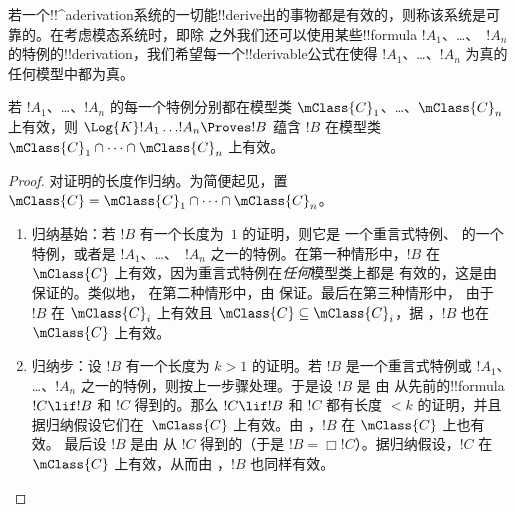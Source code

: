 \documentclass[../../../include/open-logic-section]{subfiles}
\begin{document}


若一个!!^a{derivation}系统的一切能!!{derive}出的事物都是有效的，则称该系统是可靠的。在考虑模态系统时，即除
 之外我们还可以使用某些!!{formula} $!A_1$、\dots、~$!A_n$
的特例的!!{derivation}，我们希望每一个!!{derivable}公式在使得
$!A_1$、\dots、$!A_n$ 为真的任何模型中都为真。

\begin{thm}[可靠性定理]
  若 $!A_1$、\dots、$!A_n$ 的每一个特例分别都在模型类
  $\mClass{C}_1$、\dots、$\mClass{C}_n$ 上有效，则
  $\Log{K}!A_1\dots !A_n
  \Proves !B$ 蕴含 $!B$ 在模型类
  $\mClass{C}_1 \cap \dots \cap \mClass{C}_n$ 上有效。
\end{thm}

\begin{proof}
  对证明的长度作归纳。为简便起见，置 $\mClass{C} =
  \mClass{C}_1 \cap \dots \cap \mClass{C}_n$。
  \begin{enumerate}
  \item 归纳基始：若 $!B$ 有一个长度为~$1$ 的证明，则它是
    一个重言式特例、 的一个
    特例，或者是
    $!A_1$、\dots、~$!A_n$ 之一的特例。在第一种情形中，$!B$ 在
    $\mClass{C}$ 上有效，因为重言式特例在\emph{任何}模型类上都是
    有效的，这是由  保证的。类似地，
    在第二种情形中，由
     保证。最后在第三种情形中，
    由于 $!B$ 在 $\mClass{C}_i$ 上有效且 $\mClass{C} \subseteq
    \mClass{C}_i$，据 ，$!B$ 也在
    $\mClass{C}$ 上有效。
  \item 归纳步：设 $!B$ 有一个长度为 $k>1$ 的证明。若
    $!B$ 是一个重言式特例或 $!A_1$、
    \dots、$!A_n$ 之一的特例，则按上一步骤处理。于是设 $!B$ 是
    由 \MP{} 从先前的!!{formula} $!C \lif !B$ 和
    $!C$ 得到的。那么 $!C \lif !B$ 和 $!C$ 都有长度 $<k$ 的证明，并且
    据归纳假设它们在~$\mClass{C}$ 上有效。由
    ，$!B$ 在 $\mClass{C}$ 上也有效。
    最后设 $!B$ 是由 \Nec{} 从 $!C$ 得到的（于是
    $!B = \Box!C$）。据归纳假设，$!C$ 在
    $\mClass{C}$ 上有效，从而由 ，$!B$ 也同样有效。
  \end{enumerate}
\end{proof}
\end{document}
